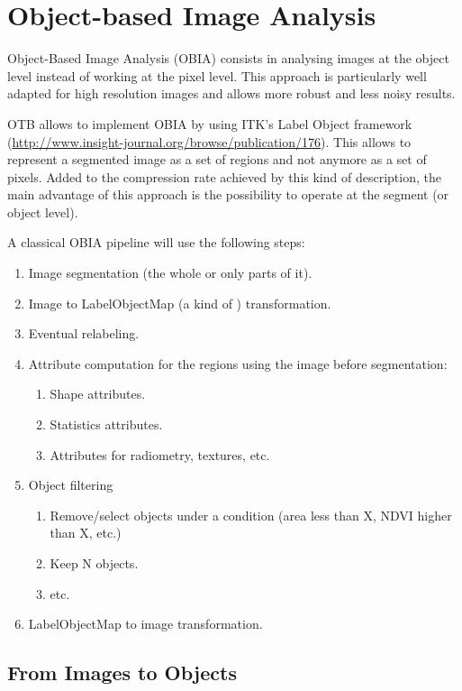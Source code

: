 
\chapter{Object-based Image Analysis }\label{sec:OBIA}

Object-Based Image Analysis (OBIA) consists in analysing images at
the object level instead of working at the pixel level. This approach
is particularly well adapted for high resolution images and allows
more robust and less noisy results.

OTB allows to implement OBIA by using ITK's Label Object framework
(\url{http://www.insight-journal.org/browse/publication/176}). This
allows to represent a segmented image as a set of regions and not
anymore as a set of pixels. Added to the compression rate achieved by
this kind of description, the main advantage of this approach is the
possibility to operate at the segment (or object level).

A classical OBIA pipeline will use the following steps:

\begin{enumerate}
\item Image segmentation (the whole or only parts of it).
\item Image to LabelObjectMap (a kind of ) transformation.
\item Eventual relabeling.
\item Attribute computation for the regions using the image before
  segmentation:
  \begin{enumerate}
         \item Shape attributes.
         \item Statistics attributes.
         \item Attributes for radiometry, textures, etc.
  \end{enumerate}

\item Object filtering
  \begin{enumerate}
         \item Remove/select objects under a condition (area less than
         X, NDVI higher than X, etc.)
	 \item Keep N objects.
	 \item etc.
  \end{enumerate}
\item LabelObjectMap to image transformation.
\end{enumerate}


\section{From Images to Objects}\label{sec:FromImagesToObjects}


